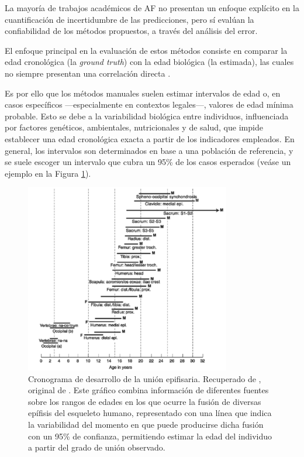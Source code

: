 La mayoría de trabajos académicos de AF no presentan un enfoque explícito en la cuantificación de incertidumbre de las predicciones, pero sí evalúan la confiabilidad de los métodos propuestos, a través del análisis del error. 

El enfoque principal en la evaluación de estos métodos consiste en comparar la edad cronológica (la \textit{ground truth}) con la edad biológica (la estimada), las cuales no siempre presentan una correlación directa \cite{marquez2015}.

Es por ello que los métodos manuales suelen estimar intervalos de edad o, en casos específicos ---especialmente en contextos legales---, valores de edad mínima probable. Esto se debe a la variabilidad biológica entre individuos, influenciada por factores genéticos, ambientales, nutricionales y de salud, que impide establecer una edad cronológica exacta a partir de los indicadores empleados. En general, los intervalos son determinados en base a una población de referencia, y se suele escoger un intervalo que cubra un 95\% de los casos esperados \cite{garvin2012} (veáse un ejemplo en la Figura \ref{fig:range_values_epiphyselial}).

\begin{figure}[htbp]
    \centering
    \includegraphics[width=0.8\textwidth]{capitulos/cap_03/imagenes/range_values_epiphyselial.png}
    \caption[
        Cronograma de desarrollo de la unión epifisaria. Recuperado de \cite{byers2023}, original de \cite{buikstra1994}.
    ]{
        Cronograma de desarrollo de la unión epifisaria. Recuperado de \cite{byers2023}, original de \cite{buikstra1994}. 
        Este gráfico combina información de diferentes fuentes sobre los rangos de edades en los que ocurre la fusión de diversas epífisis del esqueleto humano, representado con una línea que indica la variabilidad del momento en que puede producirse dicha fusión con un 95\% de confianza, permitiendo estimar la edad del individuo a partir del grado de unión observado.
    }
    \label{fig:range_values_epiphyselial}
\end{figure}

